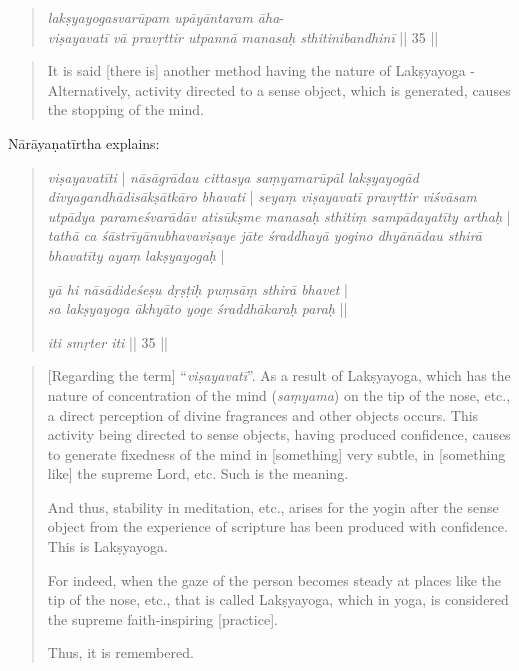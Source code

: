 \begin{quote}
  \textit{lakṣyayogasvarūpam upāyāntaram āha}-\\
  \textit{viṣayavatī vā pravṛttir utpannā manasaḥ sthitinibandhinī} || 35 ||
\end{quote}
\begin{quote}
It is said [there is] another method having the nature of Lakṣyayoga - \\
Alternatively, activity directed to a sense object, which is generated, causes the stopping of the mind.  
\end{quote}

Nārāyaṇatīrtha explains:

\begin{quote}
  \textit{viṣayavatīti} | \textit{nāsāgrādau cittasya saṃyamarūpāl lakṣyayogād divyagandhādisākṣātkāro bhavati} | \textit{seyaṃ viṣayavatī pravṛttir viśvāsam utpādya parameśvarādāv atisūkṣme manasaḥ sthitiṃ sampādayatīty arthaḥ} | \textit{tathā ca śāstrīyānubhavaviṣaye jāte śraddhayā yogino dhyānādau sthirā bhavatīty ayaṃ lakṣyayogaḥ} |

  \textit{yā hi nāsādideśeṣu dṛṣṭiḥ puṃsāṃ sthirā bhavet} |\\
  \textit{sa lakṣyayoga ākhyāto yoge śraddhākaraḥ paraḥ} ||
  
\textit{iti smṛter iti} || 35 ||
\end{quote}
\begin{quote}
  [Regarding the term] ``\textit{viṣayavatī}''. As a result of Lakṣyayoga, which has the nature of concentration of the mind (\textit{saṃyama}) on the tip of the nose, etc., a direct perception of divine fragrances and other objects occurs. This activity being directed to sense objects, having produced confidence, causes to generate fixedness of the mind in [something] very subtle, in [something like] the supreme Lord, etc. Such is the meaning.
  
  And thus, stability in meditation, etc., arises for the yogin after the sense object from the experience of scripture has been produced with confidence. This is Lakṣyayoga.
  
  For indeed, when the gaze of the person becomes steady at places like the tip of the nose, etc., that is called Lakṣyayoga, which in yoga, is considered the supreme faith-inspiring [practice].

  Thus, it is remembered.
  \end{quote}

